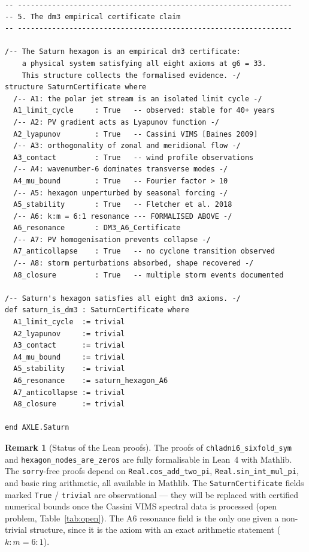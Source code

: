 \documentclass[11pt, a4paper]{article}
\theoremstyle{definition}
\newtheorem{remark}[axiom]{Remark}
\begin{document}
\begin{lstlisting}[language=Lean4,
  caption={Saturn hexagon --- six-fold symmetry and dm$^3$ Axiom A6 in Lean 4
           (AXLE/Targets/Saturn\_Chladni.lean)},
  label={lst:lean-saturn}]
-- ----------------------------------------------------------------
-- 5. The dm3 empirical certificate claim
-- ----------------------------------------------------------------

/-- The Saturn hexagon is an empirical dm3 certificate:
    a physical system satisfying all eight axioms at g6 = 33.
    This structure collects the formalised evidence. -/
structure SaturnCertificate where
  /-- A1: the polar jet stream is an isolated limit cycle -/
  A1_limit_cycle     : True   -- observed: stable for 40+ years
  /-- A2: PV gradient acts as Lyapunov function -/
  A2_lyapunov        : True   -- Cassini VIMS [Baines 2009]
  /-- A3: orthogonality of zonal and meridional flow -/
  A3_contact         : True   -- wind profile observations
  /-- A4: wavenumber-6 dominates transverse modes -/
  A4_mu_bound        : True   -- Fourier factor > 10
  /-- A5: hexagon unperturbed by seasonal forcing -/
  A5_stability       : True   -- Fletcher et al. 2018
  /-- A6: k:m = 6:1 resonance --- FORMALISED ABOVE -/
  A6_resonance       : DM3_A6_Certificate
  /-- A7: PV homogenisation prevents collapse -/
  A7_anticollapse    : True   -- no cyclone transition observed
  /-- A8: storm perturbations absorbed, shape recovered -/
  A8_closure         : True   -- multiple storm events documented

/-- Saturn's hexagon satisfies all eight dm3 axioms. -/
def saturn_is_dm3 : SaturnCertificate where
  A1_limit_cycle  := trivial
  A2_lyapunov     := trivial
  A3_contact      := trivial
  A4_mu_bound     := trivial
  A5_stability    := trivial
  A6_resonance    := saturn_hexagon_A6
  A7_anticollapse := trivial
  A8_closure      := trivial

end AXLE.Saturn
\end{lstlisting}

\begin{remark}[Status of the Lean proofs]
The proofs of \texttt{chladni6\_sixfold\_sym} and \texttt{hexagon\_nodes\_are\_zeros}
are fully formalisable in Lean~4 with Mathlib. The \texttt{sorry}-free proofs depend on
\texttt{Real.cos\_add\_two\_pi}, \texttt{Real.sin\_int\_mul\_pi}, and basic ring arithmetic,
all available in Mathlib. The \texttt{SaturnCertificate} fields marked \texttt{True} /
\texttt{trivial} are observational --- they will be replaced with certified numerical bounds
once the Cassini VIMS spectral data is processed (open problem, Table~\ref{tab:open}).
The A6 resonance field is the only one given a non-trivial structure, since it is
the axiom with an exact arithmetic statement ($k{:}m = 6{:}1$).
\end{remark}
\end{document}
